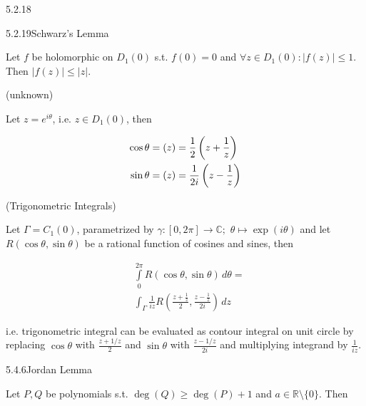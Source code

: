 \documentclass[10pt,landscape]{article}
\renewcommand{\leq}{\leqslant}
\renewcommand{\geq}{\geqslant}
\let\Re\relax
\DeclareMathOperator{\Re}{Re}
\let\Im\relax
\DeclareMathOperator{\Im}{Im}
\begin{document}
\begin{multicols}{3}
\begin{corollary}{5.2.18}{}
\end{corollary}

%
\begin{exercise}{5.2.19}{Schwarz's Lemma}

    Let $f$ be holomorphic on $D_1(0)$ s.t. $f(0) = 0$ and $\forall z \in D_1(0): |f(z)| \leq 1$. Then $|f(z)| \leq |z|$.

\end{exercise}

\begin{remark}{(unknown)}{}

    Let $z = e^{i \theta}$, i.e. $z \in D_1(0)$, then

        \begin{align*}
            \cos\theta &= \Re(z) = \frac{1}{2}\left( z + \frac{1}{z} \right) \\
            \sin\theta &= \Im(z) = \frac{1}{2i}\left( z - \frac{1}{z} \right)
        \end{align*}

\end{remark}

\begin{remark}{(Trigonometric Integrals)}{}

    Let $\Gamma = C_1(0)$, parametrized by $\gamma: [0,2\pi] \to \mathbb{C};$ $\theta \mapsto \exp(i\theta)$ and let $R(\cos\theta,\sin\theta)$ be a rational function of cosines and sines, then

        \begin{align*}
            &\int\limits_0^{2\pi} R(\cos\theta,\sin\theta) \,d\theta = \\
            &\int_{\Gamma} \frac{1}{iz} R\left(\frac{z + \frac{1}{z}}{2},\frac{z - \frac{1}{z}}{2i}\right) \,dz
        \end{align*}

    i.e. trigonometric integral can be evaluated as contour integral on unit circle by replacing $\cos\theta$ with $\frac{z + 1/z}{2}$ and $\sin\theta$ with $\frac{z - 1/z}{2i}$ and multiplying integrand by $\frac{1}{iz}$.

\end{remark}

\begin{lemma}{5.4.6}{Jordan Lemma}

    Let $P,Q$ be polynomials s.t. $\deg{(Q)} \geq \deg{(P)} + 1$ and $a \in \mathbb{R} \setminus \{0\}$. Then


\end{lemma}
\end{multicols}
\end{document}
